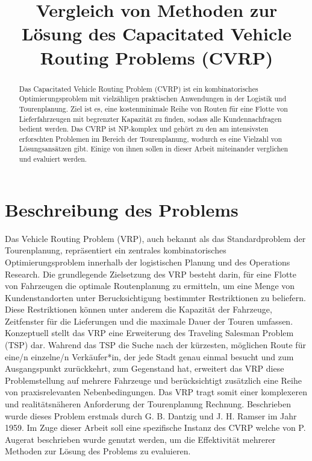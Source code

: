 \documentclass{IEEEtran}
\begin{document}
\title{Vergleich von Methoden zur Lösung des Capacitated Vehicle Routing Problems (CVRP)}

\author{
}

\maketitle

\begin{abstract}
    Das Capacitated Vehicle Routing Problem (CVRP) ist ein kombinatorisches 
    Optimierungsproblem mit vielzähligen praktischen Anwendungen 
    in der Logistik und Tourenplanung. Ziel ist es, eine kostenminimale Reihe von 
    Routen für eine Flotte von Lieferfahrzeugen mit begrenzter Kapazität zu finden, 
    sodass alle Kundennachfragen bedient werden. Das CVRP ist NP-komplex und gehört 
    zu den am intensivsten erforschten Problemen im Bereich der Tourenplanung, wodurch
    es eine Vielzahl von Lösungsansätzen gibt. Einige von ihnen sollen in dieser Arbeit
    miteinander verglichen und evaluiert werden.
\end{abstract}

\section{Beschreibung des Problems}
    Das Vehicle Routing Problem (VRP), auch bekannt als das Standardproblem der 
    Tourenplanung, repräsentiert ein zentrales kombinatorisches Optimierungsproblem 
    innerhalb der logistischen Planung und des Operations Research. Die grundlegende 
    Zielsetzung des VRP besteht darin, für eine Flotte von Fahrzeugen
    die optimale Routenplanung zu ermitteln, um eine Menge von Kundenstandorten unter 
    Berucksichtigung bestimmter Restriktionen zu beliefern. Diese Restriktionen 
    können unter anderem die Kapazität der Fahrzeuge, Zeitfenster für die Lieferungen 
    und die maximale Dauer der Touren umfassen. \newline\newline
    Konzeptuell stellt das VRP eine Erweiterung des Traveling Salesman Problem (TSP) 
    dar. Wahrend das TSP die Suche nach der kürzesten, möglichen Route für eine/n 
    einzelne/n Verkäufer*in, der jede Stadt genau einmal besucht und zum Ausgangspunkt 
    zurückkehrt, zum Gegenstand hat, erweitert das VRP diese Problemstellung auf mehrere 
    Fahrzeuge und berücksichtigt zusätzlich eine Reihe von praxisrelevanten 
    Nebenbedingungen. Das VRP tragt somit einer komplexeren und realitätsnäheren 
    Anforderung der Tourenplanung Rechnung. Beschrieben wurde dieses Problem erstmals 
    durch G. B. Dantzig und J. H. Ramser im Jahr 1959. \newline\newline
    Im Zuge dieser Arbeit soll eine spezifische Instanz des CVRP welche von 
    P. Augerat\cite{augerat} beschrieben wurde genutzt werden, um die Effektivität 
    mehrerer Methoden zur Lösung des Problems zu evaluieren. 
\end{document}
